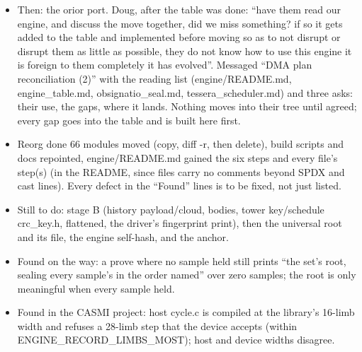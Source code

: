 \begin{itemize}
\item Then: the orior port. Doug, after the table was done: “have them read our engine, and discuss the move together, did we miss something? if so it gets added to the table and implemented before moving so as to not disrupt or disrupt them as little as possible, they do not know how to use this engine it is foreign to them completely it has evolved”. Messaged “DMA plan reconciliation (2)” with the reading list (engine/README.md, engine\_\allowbreak{}table.md, obsignatio\_\allowbreak{}seal.md, tessera\_\allowbreak{}scheduler.md) and three asks: their use, the gaps, where it lands. Nothing moves into their tree until agreed; every gap goes into the table and is built here first.
\item Reorg done 66 modules moved (copy, diff -r, then delete), build scripts and docs repointed, engine/README.md gained the six steps and every file's step(s) (in the README, since files carry no comments beyond SPDX and cast lines). Every defect in the “Found” lines is to be fixed, not just listed.
\item Still to do: stage B (history payload/cloud, bodies, tower key/schedule crc\_\allowbreak{}key.h, flattened, the driver's fingerprint print), then the universal root and its file, the engine self-hash, and the anchor.
\item Found on the way: a prove where no sample held still prints “the set's root, sealing every sample's in the order named” over zero samples; the root is only meaningful when every sample held.
\item Found in the CASMI project: host cycle.c is compiled at the library's 16-limb width and refuses a 28-limb step that the device accepts (within ENGINE\_\allowbreak{}RECORD\_\allowbreak{}LIMBS\_\allowbreak{}MOST); host and device widths disagree.
\end{itemize}

